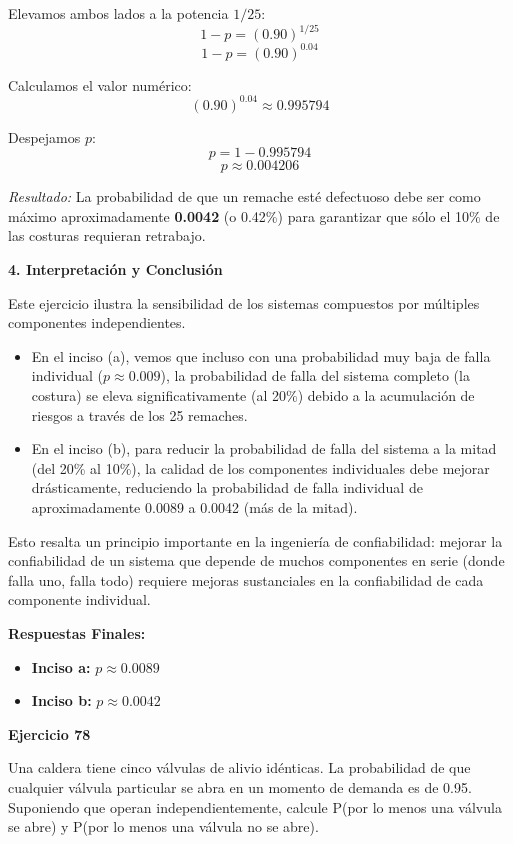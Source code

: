 \documentclass[a4paper]{article}
\begin{document}
Elevamos ambos lados a la potencia $1/25$:
$$ 1 - p = (0.90)^{1/25} $$
$$ 1 - p = (0.90)^{0.04} $$

Calculamos el valor numérico:
$$ (0.90)^{0.04} \approx 0.995794 $$

Despejamos $p$:
$$ p = 1 - 0.995794 $$
$$ p \approx 0.004206 $$

\textit{Resultado:} La probabilidad de que un remache esté defectuoso debe ser como máximo aproximadamente \textbf{0.0042} (o 0.42\%) para garantizar que sólo el 10\% de las costuras requieran retrabajo.

\vspace{0.3cm}

\textbf{4. Interpretación y Conclusión}

Este ejercicio ilustra la sensibilidad de los sistemas compuestos por múltiples componentes independientes.

\begin{itemize}
    \item En el inciso (a), vemos que incluso con una probabilidad muy baja de falla individual ($p \approx 0.009$), la probabilidad de falla del sistema completo (la costura) se eleva significativamente (al 20\%) debido a la acumulación de riesgos a través de los 25 remaches.
    \item En el inciso (b), para reducir la probabilidad de falla del sistema a la mitad (del 20\% al 10\%), la calidad de los componentes individuales debe mejorar drásticamente, reduciendo la probabilidad de falla individual de aproximadamente 0.0089 a 0.0042 (más de la mitad).
\end{itemize}

Esto resalta un principio importante en la ingeniería de confiabilidad: mejorar la confiabilidad de un sistema que depende de muchos componentes en serie (donde falla uno, falla todo) requiere mejoras sustanciales en la confiabilidad de cada componente individual.

\textbf{Respuestas Finales:}
\begin{itemize}
    \item \textbf{Inciso a:} $p \approx 0.0089$
    \item \textbf{Inciso b:} $p \approx 0.0042$
\end{itemize}

\textbf{Ejercicio 78}

Una caldera tiene cinco válvulas de alivio idénticas. La probabilidad de que cualquier válvula particular se abra en un momento de demanda es de 0.95. Suponiendo que operan independientemente, calcule P(por lo menos una válvula se abre) y P(por lo menos una válvula no se abre).
\end{document}
